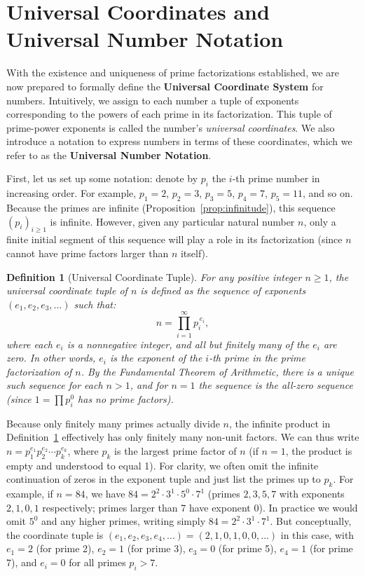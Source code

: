 \documentclass[11pt]{article}
\newtheorem{definition}{Definition}
\begin{document}
\section{Universal Coordinates and Universal Number Notation}

With the existence and uniqueness of prime factorizations established, we are now prepared to formally define the \textbf{Universal Coordinate System} for numbers. Intuitively, we assign to each number a tuple of exponents corresponding to the powers of each prime in its factorization. This tuple of prime-power exponents is called the number's \emph{universal coordinates}. We also introduce a notation to express numbers in terms of these coordinates, which we refer to as the \textbf{Universal Number Notation}.

First, let us set up some notation: denote by $p_i$ the $i$-th prime number in increasing order. For example, $p_1 = 2$, $p_2 = 3$, $p_3 = 5$, $p_4 = 7$, $p_5 = 11$, and so on. Because the primes are infinite (Proposition~\ref{prop:infinitude}), this sequence $(p_i)_{i\ge 1}$ is infinite. However, given any particular natural number $n$, only a finite initial segment of this sequence will play a role in its factorization (since $n$ cannot have prime factors larger than $n$ itself). 

\begin{definition}[Universal Coordinate Tuple]\label{def:coordinates}
For any positive integer $n \ge 1$, the \emph{universal coordinate tuple} of $n$ is defined as the sequence of exponents $(e_1, e_2, e_3, \dots)$ such that:
\[ n = \prod_{i=1}^{\infty} p_i^{\,e_i}, \] 
where each $e_i$ is a nonnegative integer, and all but finitely many of the $e_i$ are zero. In other words, $e_i$ is the exponent of the $i$-th prime in the prime factorization of $n$. By the Fundamental Theorem of Arithmetic, there is a unique such sequence for each $n>1$, and for $n=1$ the sequence is the all-zero sequence (since $1 = \prod p_i^0$ has no prime factors).
\end{definition}

Because only finitely many primes actually divide $n$, the infinite product in Definition~\ref{def:coordinates} effectively has only finitely many non-unit factors. We can thus write $n = p_1^{e_1} p_2^{e_2} \cdots p_k^{e_k}$, where $p_k$ is the largest prime factor of $n$ (if $n=1$, the product is empty and understood to equal 1). For clarity, we often omit the infinite continuation of zeros in the exponent tuple and just list the primes up to $p_k$. For example, if $n = 84$, we have $84 = 2^2 \cdot 3^1 \cdot 5^0 \cdot 7^1$ (primes $2,3,5,7$ with exponents $2,1,0,1$ respectively; primes larger than 7 have exponent 0). In practice we would omit $5^0$ and any higher primes, writing simply $84 = 2^2 \cdot 3^1 \cdot 7^1$. But conceptually, the coordinate tuple is $(e_1,e_2,e_3,e_4,\ldots) = (2,1,0,1,0,0,\ldots)$ in this case, with $e_1=2$ (for prime 2), $e_2=1$ (for prime 3), $e_3=0$ (for prime 5), $e_4=1$ (for prime 7), and $e_i=0$ for all primes $p_i > 7$.
\end{document}
